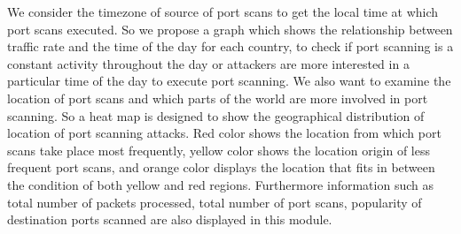 We consider the timezone of source of port scans to get the local time at which port scans executed.
So we propose a graph which shows the relationship between traffic rate and the time of the day for each country, to check if port scanning is a constant activity throughout the day or attackers are more interested in a particular time of the day to execute port scanning.
We also want to examine the location of port scans and which parts of the world are more involved in port scanning.
So a heat map is designed to show the geographical distribution of location of port scanning attacks.
Red color shows the location from which port scans take place most frequently, yellow color shows the location origin of less frequent port scans, and orange color displays the location that fits in between the condition of both yellow and red regions.
Furthermore information such as total number of packets
processed, total number of port scans, popularity of destination ports scanned are also displayed in this module.